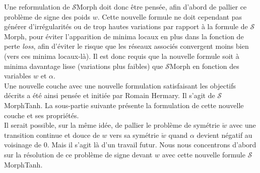 \vspace{-1.4mm}
Une reformulation de $\mathcal{S}$Morph doit donc être pensée, afin d'abord de pallier ce problème de signe des poids $w$. Cette nouvelle formule ne doit cependant pas générer d'irrégularités ou de trop hautes variations par rapport à la formule de $\mathcal{S}$Morph, pour éviter l'apparition de minima locaux en plus dans la fonction de perte \textit{loss}, afin d'éviter le risque que les réseaux associés convergent moins bien (vers ces minima locaux-là). Il est donc requis que la nouvelle formule soit à minima davantage lisse (variations plus faibles) que $\mathcal{S}$Morph en fonction des variables $w$ et $\alpha$. \\

\vspace{-2.0mm}
\noindent Une nouvelle couche avec une nouvelle formulation satisfaisant les objectifs décrits a été ainsi pensée et initiée par Romain Hermary. Il s'agit de $\mathcal{S}$MorphTanh. La sous-partie suivante présente la formulation de cette nouvelle couche et ses propriétés. \\

\vspace{-1.3mm}
Il serait possible, sur la même idée, de pallier le problème de symétrie $\breve{w}$ avec une transition continue et douce de $w$ vers sa symétrie $\breve{w}$ quand $\alpha$ devient négatif au voisinage de $0$. Mais il s'agit là d'un travail futur. Nous nous concentrons d'abord sur la résolution de ce problème de signe devant $w$ avec cette nouvelle formule $\mathcal{S}$MorphTanh.
